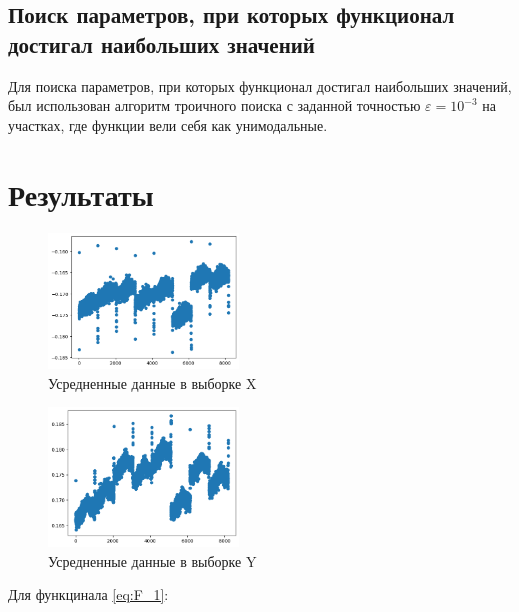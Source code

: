\documentclass{article}
\begin{document}
  \subsection{Поиск параметров, при которых функционал достигал наибольших
  значений}

  Для поиска параметров, при которых функционал достигал наибольших
  значений, был использован алгоритм троичного поиска с заданной точностью
  \( \varepsilon = 10^{-3} \) на участках, где функции вели
  себя как унимодальные.

  \section{Результаты}

  \begin{figure}[htbp!]
		\begin{center}
			\includegraphics[width = 0.45\textwidth]{x_mean.png}
			\caption{Усредненные данные в выборке X}
      \label{figure:int_est}
		\end{center}
  \end{figure}

  \begin{figure}[htbp!]
		\begin{center}
			\includegraphics[width = 0.45\textwidth]{y_mean.png}
			\caption{Усредненные данные в выборке Y}
      \label{figure:int_est}
		\end{center}
  \end{figure}

  \clearpage

  Для функцинала \ref{eq:F_1}:
\end{document}
